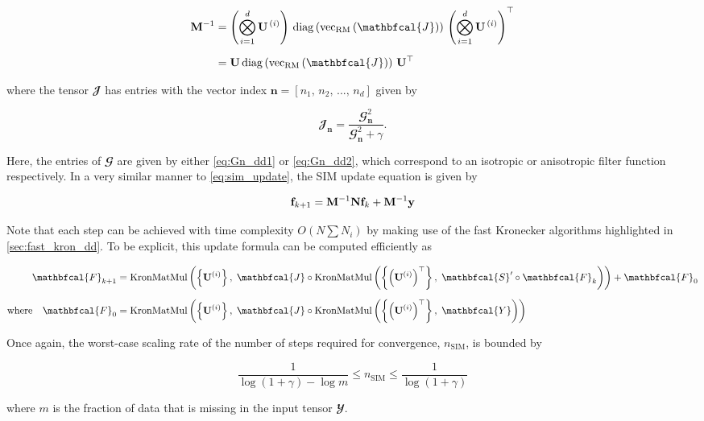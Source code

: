 \begin{align}
\M^{-1} &= \left( \bigotimes_{i=1}^d  \U^{\,(i)} \right) \, \diag{\vecrm{\mathbfcal{J}}}\, \left(\bigotimes_{i=1}^d  \U^{\,(i)} \right)^\top \notag \\[0.2cm]
&= \U \, \diag{\vecrm{\mathbfcal{J}}} \, \U^\top
\end{align}

where the tensor $\mathbfcal{J}$ has entries with the vector index $\mathbf{n} = [n_1,\, n_2,\, ...,\, n_d]$ given by 

\begin{equation}
    \mathbfcal{J}_{\mathbf{n}} = \frac{\mathbfcal{G}_{\mathbf{n}}^2}{\mathbfcal{G}_{\mathbf{n}}^2 + \gamma}.
\end{equation}

Here, the entries of $\mathbfcal{G}$ are given by either \cref{eq:Gn_dd1} or \cref{eq:Gn_dd2}, which correspond to an isotropic or anisotropic filter function respectively. In a very similar manner to \cref{eq:sim_update}, the SIM update equation is given by 

\begin{equation}
    \label{eq:sim_update_dd}
    \mathbf{f}_{k+1} = \mathbf{M}^{-1}\mathbf{N} \mathbf{f}_{k} + \mathbf{M}^{-1} \mathbf{y}
\end{equation}

Note that each step can be achieved with time complexity $O(N \sum N_i)$ by making use of the fast Kronecker algorithms highlighted in \cref{sec:fast_kron_dd}. To be explicit, this update formula can be computed efficiently as 

\begin{align*}
    \mathbfcal{F}_{k+1} &= \text{KronMatMul} \left( \left\{\U^{(i)}\right\}, \; \mathbfcal{J} \circ \text{KronMatMul} \left(\left\{\left(\U^{(i)}\right)^{\top}\right\}, \; \mathbfcal{S}' \circ \mathbfcal{F}_{k}\right) \right) + \mathbfcal{F}_{0} \\[0.2cm]
    \text{where} \quad \mathbfcal{F}_{0} &= \text{KronMatMul} \left( \left\{\U^{(i)}\right\}, \; \mathbfcal{J} \circ \text{KronMatMul} \left(\left\{\left(\U^{(i)}\right)^{\top}\right\}, \; \mathbfcal{Y}\right) \right)
\end{align*}


Once again, the worst-case scaling rate of the number of steps required for convergence, $n_{\text{SIM}}$, is bounded by

$$
\frac{1}{\log(1 + \gamma) - \log m} \leq n_{\text{SIM}} \leq \frac{1}{\log(1 + \gamma)}
$$

where $m$ is the fraction of data that is missing in the input tensor $\mathbfcal{Y}$. 

